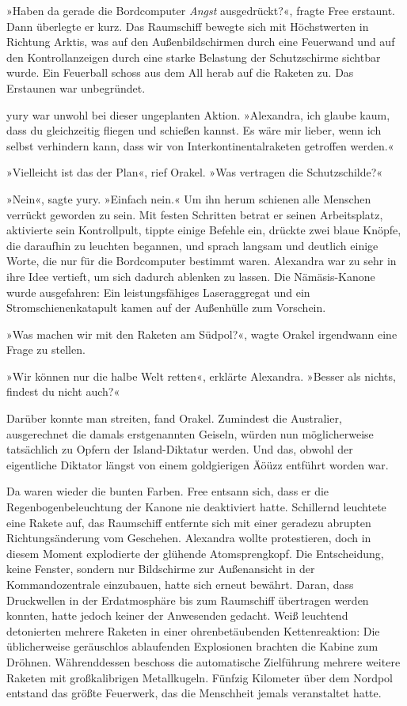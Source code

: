 »Haben da gerade die Bordcomputer \emph{Angst} ausgedrückt?«, fragte Free erstaunt. Dann überlegte er kurz. Das Raumschiff bewegte sich mit Höchstwerten in Richtung Arktis, was auf den Außenbildschirmen durch eine Feuerwand und auf den Kontrollanzeigen durch eine starke Belastung der Schutzschirme sichtbar wurde. Ein Feuerball schoss aus dem All herab auf die Raketen zu. Das Erstaunen war unbegründet.

yury war unwohl bei dieser ungeplanten Aktion. »Alexandra, ich glaube kaum, dass du gleichzeitig fliegen und schießen kannst. Es wäre mir lieber, wenn ich selbst verhindern kann, dass wir von Interkontinentalraketen getroffen werden.«

»Vielleicht ist das der Plan«, rief Orakel. »Was vertragen die Schutzschilde?«

»Nein«, sagte yury. »Einfach nein.« Um ihn herum schienen alle Menschen verrückt geworden zu sein. Mit festen Schritten betrat er seinen Arbeitsplatz, aktivierte sein Kontrollpult, tippte einige Befehle ein, drückte zwei blaue Knöpfe, die daraufhin zu leuchten begannen, und sprach langsam und deutlich einige Worte, die nur für die Bordcomputer bestimmt waren. Alexandra war zu sehr in ihre Idee vertieft, um sich dadurch ablenken zu lassen. Die Nämäsis-Kanone wurde ausgefahren: Ein leistungsfähiges Laseraggregat und ein Stromschienenkatapult kamen auf der Außenhülle zum Vorschein.

»Was machen wir mit den Raketen am Südpol?«, wagte Orakel irgendwann eine Frage zu stellen.

»Wir können nur die halbe Welt retten«, erklärte Alexandra. »Besser als nichts, findest du nicht auch?«

Darüber konnte man streiten, fand Orakel. Zumindest die Australier, ausgerechnet die damals erstgenannten Geiseln, würden nun möglicherweise tatsächlich zu Opfern der Island-Diktatur werden. Und das, obwohl der eigentliche Diktator längst von einem goldgierigen Äöüzz entführt worden war.

Da waren wieder die bunten Farben. Free entsann sich, dass er die Regenbogenbeleuchtung der Kanone nie deaktiviert hatte. Schillernd leuchtete eine Rakete auf, das Raumschiff entfernte sich mit einer geradezu abrupten Richtungsänderung vom Geschehen. Alexandra wollte protestieren, doch in diesem Moment explodierte der glühende Atomsprengkopf. Die Entscheidung, keine Fenster, sondern nur Bildschirme zur Außenansicht in der Kommandozentrale einzubauen, hatte sich erneut bewährt. Daran, dass Druckwellen in der Erdatmosphäre bis zum Raumschiff übertragen werden konnten, hatte jedoch keiner der Anwesenden gedacht. Weiß leuchtend detonierten mehrere Raketen in einer ohrenbetäubenden Kettenreaktion: Die üblicherweise geräuschlos ablaufenden Explosionen brachten die Kabine zum Dröhnen. Währenddessen beschoss die automatische Zielführung mehrere weitere Raketen mit großkalibrigen Metallkugeln. Fünfzig Kilometer über dem Nordpol entstand das größte Feuerwerk, das die Menschheit jemals veranstaltet hatte.

